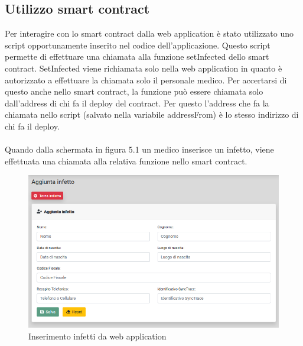 \subsection{Utilizzo smart contract}
Per interagire con lo smart contract dalla web application è stato utilizzato uno script opportunamente inserito nel codice dell'applicazione.
Questo script permette di effettuare una chiamata alla funzione setInfected dello smart contract. SetInfected viene richiamata solo nella web application in quanto è autorizzato a effettuare la chiamata solo il personale medico. Per accertarsi di questo anche nello smart contract, la funzione può essere chiamata solo dall'address di chi fa il deploy del contract. Per questo l'address che fa la chiamata nello script (salvato nella variabile addressFrom) è lo stesso indirizzo di chi fa il deploy.\\\\
Quando dalla schermata in figura 5.1 un medico inserisce un infetto, viene effettuata una chiamata alla relativa funzione nello smart contract.

\begin{figure}[h]
\caption{Inserimento infetti da web application}
\centering
\includegraphics[width=1.0\textwidth]{./immagini/webapp_infected}
\end{figure}

